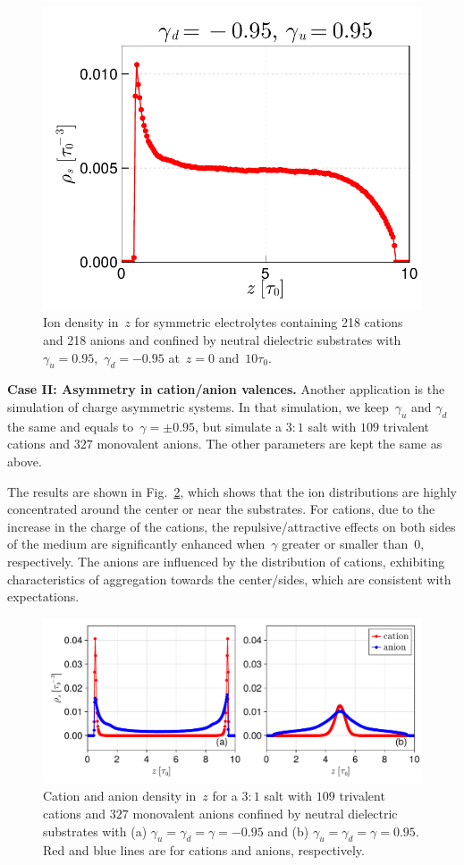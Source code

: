 \begin{figure}[htbp]
    \centering
    \includegraphics[width = 0.50\linewidth]{figs/non_symm.pdf}
    \caption{
        Ion density in~$z$ for symmetric electrolytes containing 218 cations and 218 anions and confined by neutral dielectric substrates with $\gamma_u = 0.95$,~$\gamma_d = -0.95$ at~$z = 0$ and~$10\tau_0$.
    }
    \label{fig:non_sym}
\end{figure}

\textbf{Case II: Asymmetry in cation/anion valences.}
Another application is the simulation of charge asymmetric systems.
In that simulation, we keep~$\gamma_u$ and $\gamma_d$ the same and equals to~$\gamma = \pm 0.95$, but simulate a $3:1$ salt with $109$ trivalent cations and $327$ monovalent anions. 
The other parameters are kept the same as above.

The results are shown in Fig.~\ref{fig:salt3-1}, which shows that the ion distributions are highly concentrated around the center or near the substrates.
For cations, due to the increase in the charge of the cations, the repulsive/attractive effects on both sides of the medium are significantly enhanced when~$\gamma$ greater or smaller than~$0$, respectively.
The anions are influenced by the distribution of cations, exhibiting characteristics of aggregation towards the center/sides, which are consistent with expectations.

\begin{figure}[htbp]
  \centering
  \includegraphics[width = \linewidth]{figs/density_3-1.pdf}

  \caption{
    Cation and anion density in~$z$ for a $3:1$ salt with $109$ trivalent cations and $327$ monovalent anions confined by neutral dielectric substrates with (a) $\gamma_u = \gamma_d = \gamma = - 0.95$ and (b) $\gamma_u = \gamma_d = \gamma = 0.95$.
    Red and blue lines are for cations and anions, respectively.
  }
    \label{fig:salt3-1}
\end{figure}

